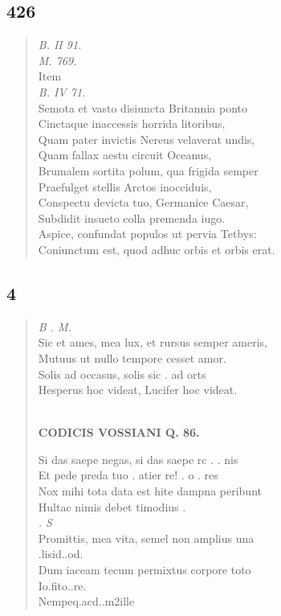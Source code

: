 \documentclass[11pt, a4paper]{report}
\begin{document}
            \subsection*{426}
      \begin{verse}
      \textit{B. II 91.} \\ \textit{M. 769.} \\  \lbrack Item \rbrack  \\ \textit{B. IV 71.} \\ Semota et vasto disiuncta Britannia ponto \\ Cinctaque inaccessis horrida litoribus, \\ Quam pater invictis Nereus velaverat undis, \\ Quam fallax aestu circuit Oceanus, \\ Brumalem sortita polum, qua frigida semper \\ Praefulget stellis Arctos inocciduis, \\ Conspectu devicta tuo, Germanice Caesar, \\ Subdidit insueto colla premenda iugo. \\ Aspice, confundat populos ut pervia Tetbys: \\ Coniunctum est, quod adhuc orbis et orbis erat. \\ 
      \end{verse}
  
            \subsection*{4}
      \begin{verse}
      \textit{B . M.} \\ Sic et ames, mea lux, et rursus semper ameris, \\ Mutuus ut nullo tempore cesset amor. \\ Solis ad occasus, solis sic . ad orts \\ Hesperus hoc videat, Lucifer hoc videat. \\ 
        ﻿\pagebreak 
    \begin{center} \textbf{CODICIS VOSSIANI Q. 86.} \end{center} \marginpar{[327]} Si das saepe negas, si das saepe rc . . nis \\ Et pede preda tuo . atier re! . o . res \\ Nox mihi tota data est hite dampna peribunt \\ Hultac nimis debet timodius . \\ \textit{. S} \\ Promittis, mea vita, semel non amplius una \\ .lisid..od. \\ Dum iaceam tecum permixtus corpore toto \\ Io.fito..re. \\ Nempeq.acd..m2ille \\ 
      \end{verse}
  
\end{document}
